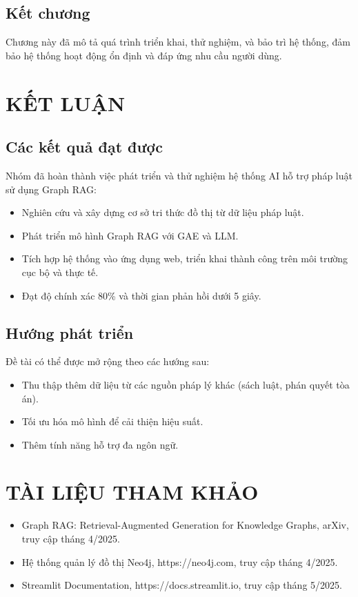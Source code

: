\documentclass[a4paper,12pt]{article}
\begin{document}
\subsection{Kết chương}
Chương này đã mô tả quá trình triển khai, thử nghiệm, và bảo trì hệ thống, đảm bảo hệ thống hoạt động ổn định và đáp ứng nhu cầu người dùng.
\clearpage

\section{KẾT LUẬN}
\subsection{Các kết quả đạt được}
Nhóm đã hoàn thành việc phát triển và thử nghiệm hệ thống AI hỗ trợ pháp luật sử dụng Graph RAG:
\begin{itemize}
    \item Nghiên cứu và xây dựng cơ sở tri thức đồ thị từ dữ liệu pháp luật.
    \item Phát triển mô hình Graph RAG với GAE và LLM.
    \item Tích hợp hệ thống vào ứng dụng web, triển khai thành công trên môi trường cục bộ và thực tế.
    \item Đạt độ chính xác 80\% và thời gian phản hồi dưới 5 giây.
\end{itemize}

\subsection{Hướng phát triển}
Đề tài có thể được mở rộng theo các hướng sau:
\begin{itemize}
    \item Thu thập thêm dữ liệu từ các nguồn pháp lý khác (sách luật, phán quyết tòa án).
    \item Tối ưu hóa mô hình để cải thiện hiệu suất.
    \item Thêm tính năng hỗ trợ đa ngôn ngữ.
\end{itemize}
\clearpage

\section{TÀI LIỆU THAM KHẢO}
\begin{itemize}
    \item Graph RAG: Retrieval-Augmented Generation for Knowledge Graphs, arXiv, truy cập tháng 4/2025.
    \item Hệ thống quản lý đồ thị Neo4j, https://neo4j.com, truy cập tháng 4/2025.
    \item Streamlit Documentation, https://docs.streamlit.io, truy cập tháng 5/2025.
\end{itemize}
\end{document}
